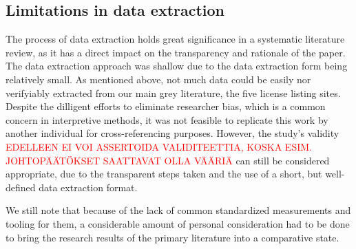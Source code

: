 \subsection{Limitations in data extraction}
The process of data extraction holds great significance in a systematic literature review, as it has a direct impact on the transparency and rationale of the paper. The data extraction approach was shallow due to the data extraction form being relatively small. As mentioned above, not much data could be easily nor verifyiably extracted from our main grey literature, the five license listing sites. Despite the dilligent efforts to eliminate researcher bias, which is a common concern in interpretive methods, it was not feasible to replicate this work by another individual for cross-referencing purposes. However, the study's validity \textcolor{red}{EDELLEEN EI VOI ASSERTOIDA VALIDITEETTIA, KOSKA ESIM. JOHTOPÄÄTÖKSET SAATTAVAT OLLA VÄÄRIÄ} can still be considered appropriate, due to the transparent steps taken and the use of a short, but well-defined data extraction format.

We still note that because of the lack of common standardized measurements and tooling for them, a considerable amount of personal consideration had to be done to bring the research results of the primary literature into a comparative state.